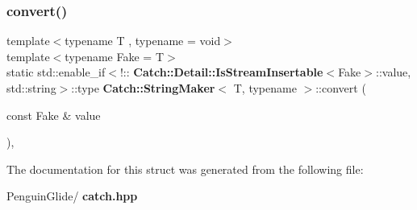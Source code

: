 \mbox{\label{struct_catch_1_1_string_maker_a68bb548de0e5ad364228b1ca3dd2f561}} 
\subsubsection{convert()\hspace{0.1cm}{\footnotesize\ttfamily [2/2]}}
{\footnotesize\ttfamily template$<$typename T , typename  = void$>$ \\
template$<$typename Fake  = T$>$ \\
static std\+::enable\+\_\+if$<$!\+::\textbf{ Catch\+::\+Detail\+::\+Is\+Stream\+Insertable}$<$Fake$>$\+::value, std\+::string$>$\+::type \textbf{ Catch\+::\+String\+Maker}$<$ T, typename $>$\+::convert (\begin{DoxyParamCaption}\item[{const Fake \&}]{value }\end{DoxyParamCaption})\hspace{0.3cm}{\ttfamily [inline]}, {\ttfamily [static]}}



The documentation for this struct was generated from the following file\+:\begin{DoxyCompactItemize}
\item 
Penguin\+Glide/\textbf{ catch.\+hpp}\end{DoxyCompactItemize}
